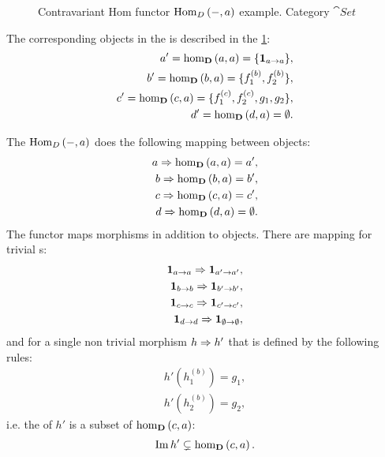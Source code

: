 \begin{example}
\begin{figure}
    \caption{Contravariant Hom functor $\mathrm{Hom}_{D}\left(-, a\right)$ example. Category $\cat{Set}$}
    \label{fig:con_hom_functor_set}
  \end{figure}

The corresponding
objects in the  is described in the
\cref{fig:con_hom_functor_set}: 
\begin{eqnarray}
a' = \catmset[D]{a}{a} = \{\idm{a}\},
\nonumber \\
b' = \catmset[D]{b}{a} = \{f_1^{(b)}, f_2^{(b)}\}, 
\nonumber \\
c' = \catmset[D]{c}{a} = \{f_1^{(c)}, f_2^{(c)}, g_1, g_2\}, 
\nonumber \\
d' = \catmset[D]{d}{a} = \emptyset.
\nonumber
\end{eqnarray}

The $\mathrm{Hom}_{D}\left(-, a\right)$ does the following mapping between objects:
\begin{eqnarray}
a \tof \catmset[D]{a}{a} = a',
\nonumber \\
b \tof \catmset[D]{b}{a} = b', 
\nonumber \\
c \tof \catmset[D]{c}{a} = c', 
\nonumber \\
d \tof \catmset[D]{d}{a} = \emptyset.
\nonumber
\end{eqnarray}
The functor maps morphisms in addition to objects. There are mapping
for trivial s: 
\begin{eqnarray}
\mathbf{1}_{ a \to a } \Rightarrow \mathbf{1}_{ a' \to a' },
\nonumber \\
\mathbf{1}_{ b \to b } \Rightarrow \mathbf{1}_{ b' \to b' },
\nonumber \\
\mathbf{1}_{ c \to c } \Rightarrow \mathbf{1}_{ c' \to c' },
\nonumber \\
\mathbf{1}_{ d \to d } \Rightarrow \mathbf{1}_{ \emptyset \to \emptyset },
\nonumber
\end{eqnarray}
and for a single non trivial morphism $h \Rightarrow h'$ that is defined by
the following rules:
\begin{eqnarray}
h'(h_1^{(b)}) = g_1,
\nonumber \\
h'(h_2^{(b)}) = g_2,
\nonumber
\end{eqnarray}
i.e. the  of $h'$ is a subset of
$\catmset[D]{c}{a}$:
\[
\Ima{h'} \subsetneq \catmset[D]{c}{a}.
\]
\end{example}

